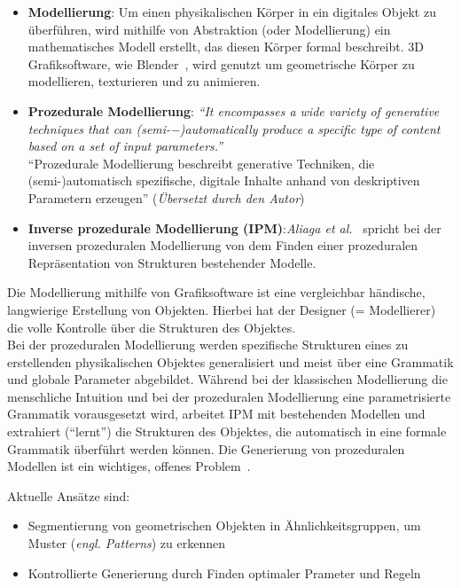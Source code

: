 \documentclass[11pt]{article}
\begin{document}
    \begin{itemize}
        \item \textbf{Modellierung}: Um einen physikalischen Körper in ein digitales Objekt zu überführen, wird mithilfe
        von Abstraktion (oder Modellierung) ein mathematisches Modell erstellt, das diesen Körper formal beschreibt.
        3D Grafiksoftware, wie Blender~\cite{blender}, wird genutzt um geometrische Körper zu modellieren, texturieren
        und zu animieren.
        \item \textbf{Prozedurale Modellierung}: \textit{"`It encompasses a wide variety of generative techniques that
        can (semi-−)automatically produce a specific type of content based on a set of input
        parameters."'}~\cite{1} \\
        "`Prozedurale Modellierung beschreibt generative Techniken, die \\(semi-)automatisch spezifische, digitale
        Inhalte anhand von deskriptiven Parametern erzeugen"' (\textit{Übersetzt durch den Autor})
        \item \textbf{Inverse prozedurale Modellierung (IPM)}:\textit{Aliaga et al.}~\cite{4}
        spricht bei der inversen prozeduralen Modellierung von dem Finden einer prozeduralen Repräsentation von
        Strukturen bestehender Modelle.
    \end{itemize}
    Die Modellierung mithilfe von Grafiksoftware ist eine vergleichbar händische, langwierige Erstellung von
    Objekten.
    Hierbei hat der Designer (= Modellierer) die volle Kontrolle über die Strukturen des Objektes.\\
    Bei der prozeduralen Modellierung werden spezifische Strukturen eines zu erstellenden physikalischen Objektes
    generalisiert und meist über eine Grammatik und globale Parameter abgebildet.
    Während bei der klassischen Modellierung die menschliche Intuition und bei der prozeduralen Modellierung eine
    parametrisierte Grammatik vorausgesetzt wird, arbeitet IPM mit bestehenden Modellen und extrahiert ("`lernt"')
    die Strukturen des Objektes, die automatisch in eine formale Grammatik überführt werden können.
    Die Generierung von prozeduralen Modellen ist ein wichtiges, offenes Problem~\cite{4}.

    \newpage

    Aktuelle Ansätze sind:
    \begin{itemize}
        \item Segmentierung von geometrischen Objekten in Ähnlichkeitsgruppen, um Muster (\textit{engl. Patterns}) zu
        erkennen
        \item Kontrollierte Generierung durch Finden optimaler Prameter und Regeln
    \end{itemize}
\end{document}
